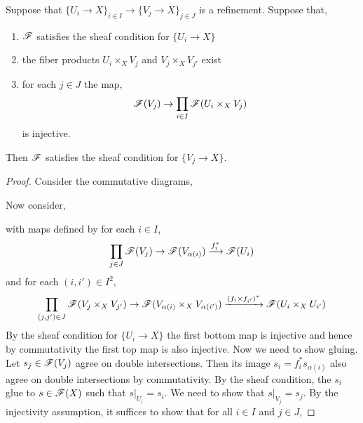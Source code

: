 \documentclass[12pt]{article}
\begin{document}
\begin{lemma}
Suppose that $\{ U_i \to X \}_{i \in I} \to \{ V_j \to X \}_{j \in J}$ is a refinement. Suppose that,
\begin{enumerate}
\item $\mathscr{F}$ satisfies the sheaf condition for $\{ U_i \to X \}$
\item the fiber products $U_i \times_X V_j$ and $V_j \times_X V_{j'}$ exist
\item for each $j \in J$ the map,
\[ \mathscr{F}(V_j) \to \prod_{i \in I} \mathscr{F}(U_i \times_X V_j) \]
is injective.
\end{enumerate}
Then $\mathscr{F}$ satisfies the sheaf condition for $\{ V_j \to X \}$.
\end{lemma}

\begin{proof}
Consider the commutative diagrams,
\begin{center}
\end{center}
Now consider,
\begin{center}
\end{center}
with maps defined by for each $i \in I$,
\[ \prod\limits_{j \in J} \mathscr{F}(V_j) \to \mathscr{F}(V_{\alpha(i)}) \xrightarrow{f_i^*} \mathscr{F}(U_i) \]
and for each $(i,i') \in I^2$,
\[ \prod\limits_{(j,j') \in J} \mathscr{F}(V_j \times_X V_{j'}) \to \mathscr{F}(V_{\alpha(i)} \times_X V_{\alpha(i')}) \xrightarrow{(f_i \times f_{i'})^*} \mathscr{F}(U_i \times_X U_{i'}) \]
By the sheaf condition for $\{ U_i \to X \}$ the first bottom map is injective and hence by commutativity the first top map is also injective. Now we need to show gluing. Let $s_j \in \mathscr{F}(V_j)$ agree on double intersections. Then its image $s_i = f_i^* s_{\alpha(i)}$ also agree on double intersections by commutativity. By the sheaf condition, the $s_i$ glue to $s \in \mathscr{F}(X)$ such that $s|_{U_i} = s_i$. We need to show that $s|_{V_j} = s_j$. By the injectivity assumption, it suffices to show that for all $i \in I$ and $j \in J$,

\end{proof}
\end{document}
